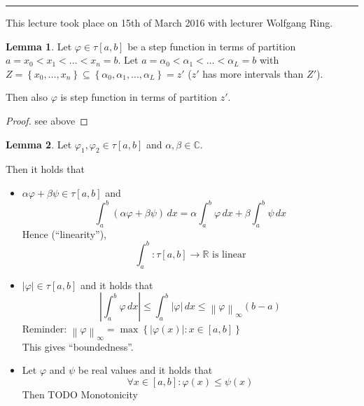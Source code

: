 \documentclass[a4paper,landscape,twocolumn]{article}
\theoremstyle{definition}
\newtheorem{lemma}{Lemma}
\newcommand\set[1]{\left\{#1\right\}}
\newcommand\abs[1]{\left|#1\right|}
\newcommand\meta[3]{\hrule{} This #1 took place on #2 with lecturer #3.\par}
\newcommand\norm[1]{\left\|#1\right\|}
\begin{document}
\meta{lecture}{15th of March 2016}{Wolfgang Ring}

\begin{lemma}
  Let $\varphi \in \tau[a,b]$ be a step function in terms of partition
  $a = x_0 < x_1 < \ldots < x_n = b$.
  Let $a = \alpha_0 < \alpha_1 < \ldots < \alpha_L = b$ with
  $Z = \set{x_0, \ldots, x_n} \subseteq \set{\alpha_0, \alpha_1, \ldots, \alpha_L} = z'$
  ($z'$ has more intervals than $Z'$).

  Then also $\varphi$ is step function in terms of partition $z'$.
\end{lemma}

\begin{proof}
  see above
\end{proof}

\begin{lemma}
  Let $\varphi_1, \varphi_2 \in \tau[a,b]$ and $\alpha, \beta \in \mathbb C$.

  Then it holds that
  \begin{itemize}
    \item $\alpha \varphi + \beta \psi \in \tau[a,b]$ and
      \[ \int_a^b (\alpha \varphi + \beta \psi) \, dx = \alpha \int_a^b \varphi \, dx + \beta \int_a^b \psi \, dx \]
      Hence (\enquote{linearity}),
      \[ \int_a^b: \tau[a,b] \to \mathbb R \text{ is linear} \]
    \item $\abs{\varphi} \in \tau[a,b]$ and it holds that
      \[ \abs{\int_a^b \varphi \, dx} \leq \int_a^b \abs{\varphi} \, dx \leq \norm{\varphi}_\infty (b-a) \]
      Reminder: $\norm{\varphi}_\infty = \max\set{\abs{\varphi(x)}: x \in [a,b]}$ \\
      This gives \enquote{boundedness}.
    \item Let $\varphi$ and $\psi$ be real values and it holds that
      \[ \forall x \in [a,b]: \varphi(x) \leq \psi(x) \]
      Then
      TODO
      Monotonicity
  \end{itemize}
\end{lemma}
\end{document}
